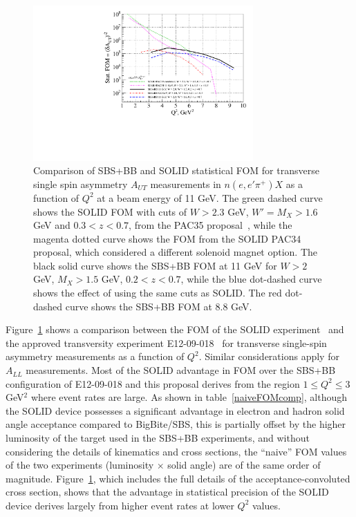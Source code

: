 \begin{figure}[h]
  \begin{center}
    \includegraphics[width=0.75\textwidth]{figures/SBS_SOLID_FOM_comparison_Q2.pdf}
  \end{center}
  \caption{\label{SBS_SOLID_FOM_Q2} Comparison of SBS+BB and SOLID statistical FOM for transverse single spin asymmetry $A_{UT}$ measurements in $n(e,e'\pi^+)X$ as a function of $Q^2$ at a beam energy of 11 GeV. The green dashed curve shows the SOLID FOM with cuts of $W > 2.3$ GeV, $W' = M_X > 1.6$ GeV and $0.3 < z < 0.7$, from the PAC35 proposal~\cite{SOLID_SIDIS_TRANS_3He}, while the magenta dotted curve shows the FOM from the SOLID PAC34 proposal, which considered a different solenoid magnet option. The black solid curve shows the SBS+BB FOM at 11 GeV for $W > 2$ GeV, $M_X > 1.5$ GeV, $0.2 < z < 0.7$, while the blue dot-dashed curve shows the effect of using the same cuts as SOLID. The red dot-dashed curve shows the SBS+BB FOM at 8.8 GeV. }
\end{figure}
Figure~\ref{SBS_SOLID_FOM_Q2} shows a comparison between the FOM of the SOLID experiment~\cite{SOLID_SIDIS_TRANS_3He} and the approved transversity experiment E12-09-018~\cite{SBS_SIDIS} for transverse single-spin asymmetry measurements as a function of $Q^2$. Similar considerations apply for $A_{LL}$ measurements. Most of the SOLID advantage in FOM over the SBS+BB configuration of E12-09-018 and this proposal derives from the region $1 \le Q^2 \le 3$ GeV$^2$ where event rates are large. As shown in table~\ref{naiveFOMcomp}, although the SOLID device possesses a significant advantage in electron and hadron solid angle acceptance compared to BigBite/SBS, this is partially offset by the higher luminosity of the target used in the SBS+BB experiments, and without considering the details of kinematics and cross sections, the ``naive'' FOM values of the two experiments (luminosity $\times$ solid angle) are of the same order of magnitude. Figure~\ref{SBS_SOLID_FOM_Q2}, which includes the full details of the acceptance-convoluted cross section, shows that the advantage in statistical precision of the SOLID device derives largely from higher event rates at lower $Q^2$ values.  
